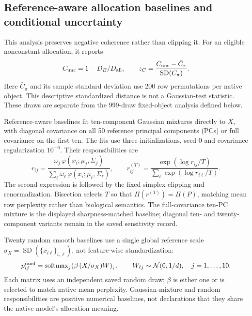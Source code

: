 \documentclass[11pt]{article}
\begin{document}
\subsection{Reference-aware allocation baselines and conditional uncertainty}

This analysis preserves negative coherence rather than clipping it. For an eligible nonconstant allocation, it reports
\begin{equation}
 C_{\rm unc}=1-D_E/D_{\rm all},\qquad
 z_C=\frac{C_{\rm unc}-\bar C_{\pi}}{\operatorname{SD}(C_{\pi})}.
\end{equation}
Here $\bar C_{\pi}$ and its sample standard deviation use 200 row permutations per native object. This descriptive standardized distance is not a Gaussian-test statistic. These draws are separate from the 999-draw fixed-object analysis defined below.

Reference-aware baselines fit ten-component Gaussian mixtures directly to $X$, with diagonal covariance on all 50 reference principal components (PCs) or full covariance on the first ten. The fits use three initializations, seed 0 and covariance regularization $10^{-6}$. Their responsibilities are
\begin{equation}
 r_{ij}=\frac{\omega_j\,\varphi(x_i;\mu_j,\Sigma_j)}{\sum_\ell\omega_\ell\,\varphi(x_i;\mu_\ell,\Sigma_\ell)},\qquad
 r_{ij}^{(T)}=\frac{\exp(\log r_{ij}/T)}{\sum_\ell\exp(\log r_{i\ell}/T)}.
\end{equation}
The second expression is followed by the fixed simplex clipping and renormalization. Bisection selects $T$ so that $\Pi(r^{(T)})=\Pi(P)$, matching mean row perplexity rather than biological semantics. The full-covariance ten-PC mixture is the displayed sharpness-matched baseline; diagonal ten- and twenty-component variants remain in the saved sensitivity record.

Twenty random smooth baselines use a single global reference scale $\sigma_X=\operatorname{SD}(\{x_{i\ell}\}_{i,\ell})$, not feature-wise standardization:
\begin{equation}
 p^{\rm rand}_{ij}=\operatorname{softmax}_j\!\left(\beta\,(X/\sigma_X)W\right)_i,\qquad
 W_{\ell j}\sim\mathcal N(0,1/d),\quad j=1,\ldots,10.
\end{equation}
Each matrix uses an independent saved random draw; $\beta$ is either one or is selected to match native mean perplexity. Gaussian-mixture and random responsibilities are positive numerical baselines, not declarations that they share the native model's allocation meaning.
\end{document}
